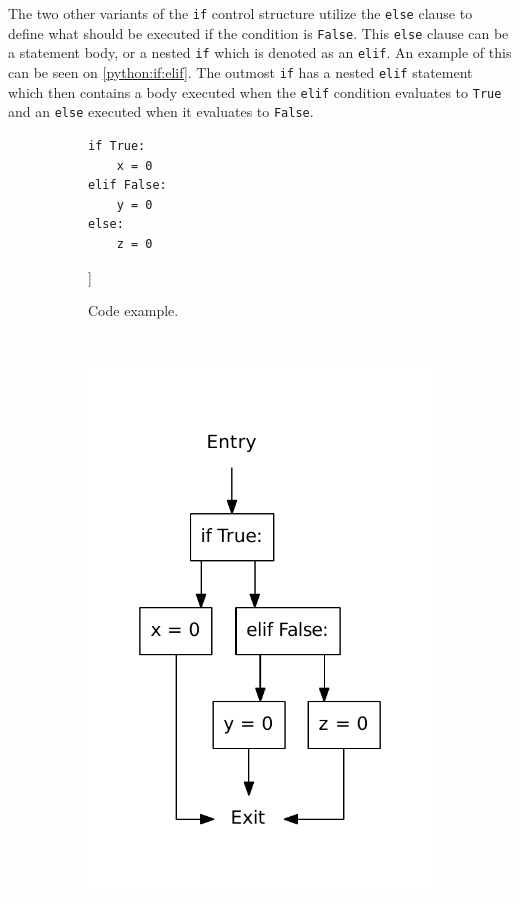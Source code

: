 The two other variants of the \texttt{if} control structure utilize the \texttt{else} clause to define what should be executed if the condition is \texttt{False}.
This \texttt{else} clause can be a statement body, or a nested \texttt{if} which is denoted as an \texttt{elif}.
An example of this can be seen on \cref{python:if:elif}.
The outmost \texttt{if} has a nested \texttt{elif} statement which then contains a body executed when the \texttt{elif} condition evaluates to \texttt{True} and an \texttt{else} executed when it evaluates to \texttt{False}.


\begin{figure}[H]
  \centering
  \begin{subfigure}[b]{0.4\textwidth}
    \begin{lstlisting}[style=python]
if True:
    x = 0
elif False:
    y = 0
else:
    z = 0
    \end{lstlisting}
    \caption{Code example.}\label{python:if:elif:code}]
  \end{subfigure}
  ~ %
  \begin{subfigure}[b]{0.4\textwidth}
    \centering
    \includegraphics[scale=.4]{./figures/if_else_elif.pdf}

\end{subfigure}
\end{figure}
